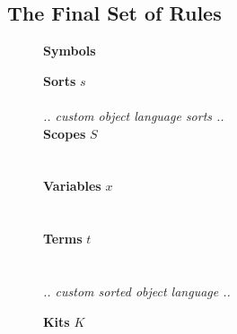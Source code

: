 \documentclass[screen,nonacm]{acmart}
\begin{document}
\subsection{The Final Set of Rules}\label{sec:ags-rls}
\begin{figure}[t]
      \centering
      \small
      {\raggedright \textbf{\Large Symbols} \par}
      \vspace{1.5em}

      \begin{minipage}[t]{0.48\textwidth}
            \raggedright{}
            \textbf{Sorts} $s$ \\
            \ESortTy{}\\
            \vspace{0.5em}
            \emph{.. custom object language sorts ..}\\
            \vspace{0.5em}
            \textbf{Scopes} $S$ \\
            \EScopeDefTy{}\\
            \vspace{0.5em}
            \EScopeDef{}\\
            \vspace{0.5em}
            \textbf{Variables} $x$ \\
            \EVarsTy{}\\
            \vspace{0.5em}
            \EVars{}\\
            \vspace{0.5em}
            \textbf{Terms} $t$ \\
            \ETmC{}\\
            \vspace{0.5em}
            \EVarC{}\\
            \emph{.. custom sorted object language ..}\\
            \vspace{1.0em}
      \end{minipage}
      \hfill
      \begin{minipage}[t]{0.48\textwidth}
            \raggedright{}
            \textbf{Kits} $K$ \\
            \EKitDefTy{}\\
            \vspace{0.5em}
            \EKitDef{}\\
            \vspace{0.5em}

\end{minipage}
\end{figure}
\end{document}
